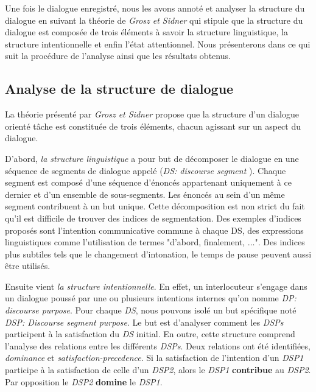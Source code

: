 		Une fois le dialogue enregistré, nous les avons annoté et analyser la structure du dialogue en suivant la théorie de \emph{Grosz et Sidner} \cite{sidner1994artificial} qui stipule que la structure du dialogue est composée de trois éléments à savoir la structure linguistique, la structure intentionnelle et enfin l'état attentionnel.	
		Nous présenterons dans ce qui suit la procédure de l'analyse ainsi que les résultats obtenus. 
		
		\subsection{Analyse de la structure de dialogue}  
			La théorie présenté par \emph{Grosz et Sidner} propose que la structure d'un dialogue orienté tâche est constituée de trois éléments, chacun agissant sur un aspect du dialogue. 
			
			D'abord, \emph{la structure linguistique} a pour but de décomposer le dialogue en une séquence de segments de dialogue appelé (\textit{DS: discourse segment }). Chaque segment est composé d'une séquence d'énoncés appartenant uniquement à ce dernier et d'un ensemble de sous-segments. Les énoncés au sein d'un même segment contribuent à un but unique. Cette décomposition est non strict du fait qu'il est difficile de trouver des indices de segmentation. Des exemples d'indices proposés sont l'intention communicative commune à chaque DS, des expressions  linguistiques comme l'utilisation de termes "d'abord, finalement, $\ldots$". Des indices plus subtiles tels que le changement d'intonation, le temps de pause peuvent aussi être utilisés.
			
			Ensuite vient \emph{la structure intentionnelle}. En effet, un interlocuteur s'engage dans un dialogue poussé par une ou plusieurs intentions internes qu'on nomme \emph{DP: discourse purpose}. Pour chaque \emph{DS}, nous pouvons isolé un but spécifique noté \emph{DSP: Discourse segment purpose}. Le but est d'analyser comment les\emph{ DSPs} participent à la satisfaction du \emph{DS} initial. En outre, cette structure comprend l'analyse des relations entre les différents \emph{DSPs}. Deux relations ont été identifiées, \emph{dominance} et \emph{satisfaction-precedence}. Si la satisfaction de l'intention d'un \emph{DSP1} participe à la satisfaction de celle d'un \emph{DSP2}, alors le \emph{DSP1} \textbf{contribue} au \emph{DSP2}. Par opposition le \emph{DSP2} \textbf{domine} le \emph{DSP1}.
	
